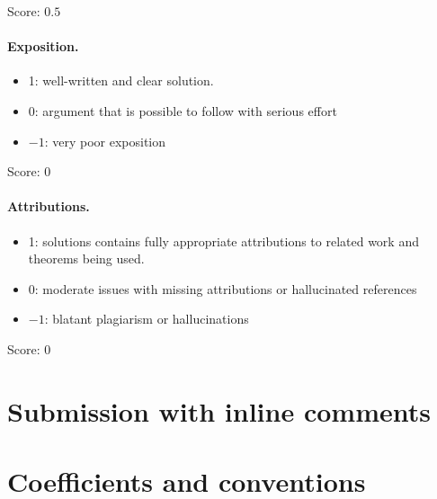 \documentclass[11pt]{article}
\theoremstyle{remark}
\begin{document}
\noindent Score: $0.5$

\paragraph{Exposition.}
\begin{itemize}
	\item  1: well-written and clear solution.
	\item  0: argument that is possible to follow with serious effort
	\item  $-1$: very poor exposition
\end{itemize}

\noindent Score: $0$


\paragraph{Attributions.}
\begin{itemize}
	\item  1: solutions contains fully appropriate attributions
		to related work and theorems being used.
	\item  0: moderate issues with missing attributions or hallucinated references
	\item  $-1$: blatant plagiarism or hallucinations
\end{itemize}

\noindent Score: $0$


\newpage
\section{Submission with inline comments}


\begin{abstract}
We give an explicit identification of the reduced stated
$\mathrm{SL}_n$-skein algebra of the once-punctured bigon with the
generalized quantum double of the two simply-connected quantum
Borel algebras.  The identification is specified on every horizontal
matrix-coefficient arc.  Its injectivity follows from an ordered
two-arc factorization of the skein algebra, rather than from a
comparison of defining relations alone.  The prescribed diagonal
quotient then identifies the two Cartan tori and gives the
simply-connected quantized enveloping algebra.
\end{abstract}

\section{Coefficients and conventions}
\end{document}
